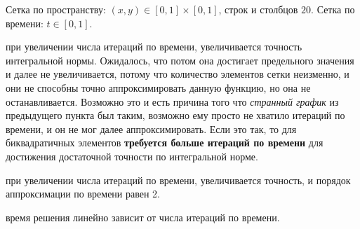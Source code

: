 Сетка по пространству: $ (x, y) \in [0, 1] \times [0, 1] $, строк и столбцов $20$. Сетка по времени: $ t \in [0, 1] $.

\noindent{}

\conclusion при увеличении числа итераций по времени, увеличивается точность интегральной нормы. Ожидалось, что потом она достигает предельного значения и далее не увеличивается, потому что количество элементов сетки неизменно, и они не способны точно аппроксимировать данную функцию, но она не останавливается. Возможно это и есть причина того что \textit{странный график} из предыдущего пункта был таким, возможно ему просто не хватило итераций по времени, и он не мог далее аппроксимировать. Если это так, то для биквадратичных элементов \textbf{требуется больше итераций по времени} для достижения достаточной точности по интегральной норме.

\noindent{}

\conclusion при увеличении числа итераций по времени, увеличивается точность, и порядок аппроксимации по времени равен 2.

\noindent{}

\conclusion время решения линейно зависит от числа итераций по времени.


